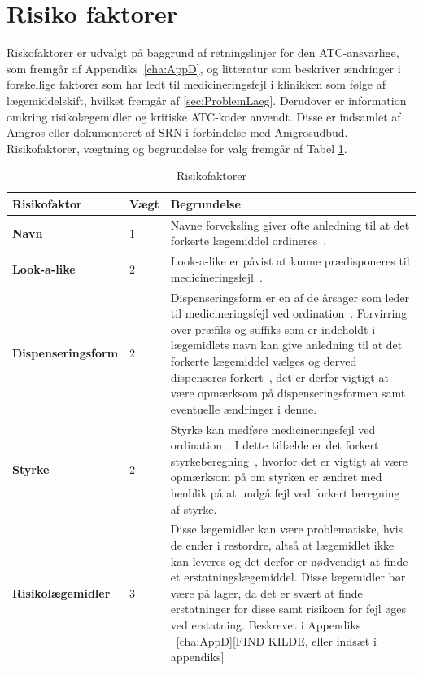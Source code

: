 \section{Risiko faktorer}
Riskofaktorer er udvalgt på baggrund af retningslinjer for den ATC-ansvarlige, som fremgår af Appendiks~\ref{cha:AppD}, og litteratur som beskriver ændringer i forskellige faktorer som har ledt til medicineringsfejl i klinikken som følge af lægemiddelskift, hvilket fremgår af \ref{sec:ProblemLaeg}. Derudover er information omkring risikolægemidler og kritiske ATC-koder anvendt. Disse er indsamlet af Amgros eller dokumenteret af SRN i forbindelse med Amgrosudbud. Risikofaktorer, vægtning og begrundelse for valg fremgår af Tabel \ref{table:features}.

\begin{longtable}{p{3.5cm}| p{1cm} | p{9.5cm}}
	\caption{Risikofaktorer}
	\label{table:features} \\
\cellcolor[HTML]{C0C0C0} {\textbf{Risikofaktor}} & \cellcolor[HTML]{C0C0C0} {\textbf{Vægt}}& \cellcolor[HTML]{C0C0C0} {\textbf{Begrundelse}}  \\ \hline
\textbf{Navn} & 1 & Navne forveksling giver ofte anledning til at det forkerte lægemiddel ordineres~\citep{DanskSelskabforPatientsikkerhed2009}. \\  \hline 
\textbf{Look-a-like} & 2 & Look-a-like er påvist at kunne prædisponeres til medicineringsfejl~\citep{Wittich2014}.\\  \hline 
\textbf{Dispenseringsform} & 2 & Dispenseringsform er en af de årsager som leder til medicineringsfejl ved ordination~\citep{Agrawal2009}. Forvirring over præfiks og suffiks som er indeholdt i lægemidlets navn kan give anledning til at det forkerte lægemiddel vælges og derved dispenseres forkert~\citep{DanskSelskabforPatientsikkerhed2009}, det er derfor vigtigt at være opmærksom på dispenseringsformen samt eventuelle ændringer i denne.\\ \hline 
\textbf{Styrke} & 2 & Styrke kan medføre medicineringsfejl ved ordination~\citep{Agrawal2009}. I dette tilfælde er det forkert styrkeberegning~\citep{Agrawal2009}, hvorfor det er vigtigt at være opmærksom på om styrken er ændret med henblik på at undgå fejl ved forkert beregning af styrke.  \\ \hline
\textbf{Risikolægemidler} & 3 & Disse lægemidler kan være problematiske, hvis de ender i restordre, altså at lægemidlet ikke kan leveres og det derfor er nødvendigt at finde et erstatningslægemiddel. Disse lægemidler bør være på lager, da det er svært at finde erstatninger for disse samt risikoen for fejl øges ved erstatning. Beskrevet i Appendiks ~\ref{cha:AppD}[FIND KILDE, eller indsæt i appendiks]  \\ \hline 

\end{longtable}
